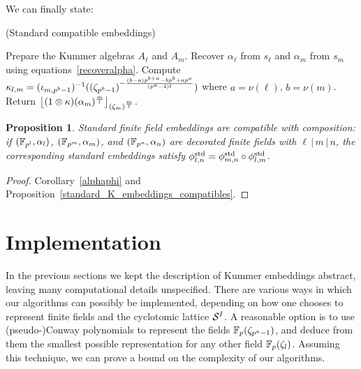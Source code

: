 \documentclass{sig-alternate}
\newtheorem{proposition}[theorem]{Proposition}
\begin{document}
We can finally state:
\begin{algorithm}
  \caption{(Standard compatible embeddings)}
  \label{algo:std_embed}
  \begin{algorithmic}[1]
  \STATE Prepare the Kummer algebras $A_\ell$ and $A_m$.
  \STATE Recover $\alpha_\ell$ from $s_\ell$ and $\alpha_m$ from $s_m$ using equations~\eqref{recoveralpha}.\vspace{-.7\baselineskip}
  \STATE Compute $\kappa_{l,m}=({\iota_{{m},{p^b-1}}})^{-1}((\zeta_{p^b-1})^{-\frac{(b-a)p^{b+a}-bp^b+ap^a}{(p^a-1)l}})$ where $a=\nu(\ell)$, $b=\nu(m)$.
  \STATE Return $\left\lfloor (1\otimes\kappa)(\alpha_m)^{\frac{m}{l}} \right\rfloor_{(\zeta_m)^{\frac{m}{l}}}$.
  \end{algorithmic}
\end{algorithm}
\begin{proposition}
\label{standard_ff_embeddings_compatibles}
Standard finite field embeddings are compatible with composition:
if $(\mathbb{F}_{p^l},\alpha_l)$, $(\mathbb{F}_{p^m},\alpha_m)$, and $(\mathbb{F}_{p^n},\alpha_n)$ are decorated finite fields
with $\ell\,|\,m\,|\,n$, the corresponding standard embeddings
satisfy ${\phi^{\mathrm{std}}_{{l},{n}}}={\phi^{\mathrm{std}}_{{m},{n}}}\circ{\phi^{\mathrm{std}}_{{l},{m}}}$.
\end{proposition}
\begin{proof}
Corollary~\ref{alphaphi} and Proposition~\ref{standard_K_embeddings_compatibles}.
\end{proof}

\section{Implementation}
\label{sec:implementation}

In the previous sections we kept the description of Kummer embeddings
abstract, leaving many computational details unspecified. %
There are various ways in which our algorithms can possibly be
implemented, depending on how one chooses to represent finite fields
and the cyclotomic lattice $\mathcal{S}^{I}$. %
A reasonable option is to use (pseudo-)Conway polynomials to represent
the fields $\mathbb{F}_p(\zeta_{p^a-1})$, and deduce from them the smallest
possible representation for any other field $\mathbb{F}_p(\zeta_l)$. %
Assuming this technique, we can prove a bound on the complexity of our
algorithms.
\end{document}
